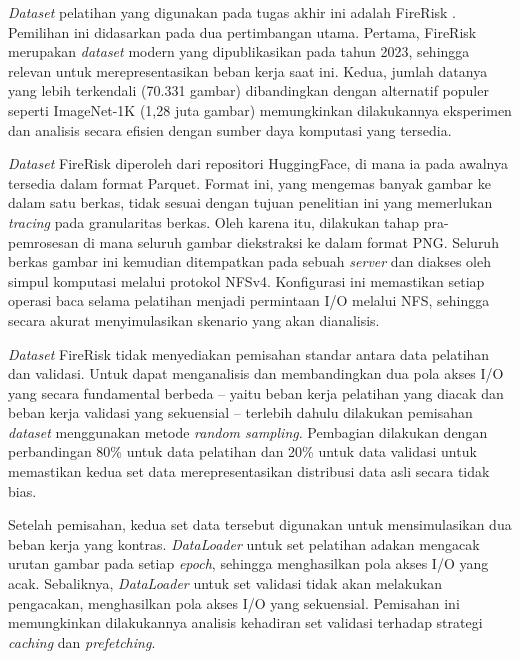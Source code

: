 \textit{Dataset} pelatihan yang digunakan pada tugas akhir ini adalah FireRisk \parencite{FireRisk}. Pemilihan ini didasarkan pada dua pertimbangan utama. Pertama, FireRisk merupakan \textit{dataset} modern yang dipublikasikan pada tahun 2023, sehingga relevan untuk merepresentasikan beban kerja saat ini. Kedua, jumlah datanya yang lebih terkendali (70.331 gambar) dibandingkan dengan alternatif populer seperti ImageNet-1K (1,28 juta gambar) memungkinkan dilakukannya eksperimen dan analisis secara efisien dengan sumber daya komputasi yang tersedia.

\textit{Dataset} FireRisk diperoleh dari repositori HuggingFace, di mana ia pada awalnya tersedia dalam format Parquet. Format ini, yang mengemas banyak gambar ke dalam satu berkas, tidak sesuai dengan tujuan penelitian ini yang memerlukan \textit{tracing} pada granularitas berkas. Oleh karena itu, dilakukan tahap pra-pemrosesan di mana seluruh gambar diekstraksi ke dalam format PNG. Seluruh berkas gambar ini kemudian ditempatkan pada sebuah \textit{server} dan diakses oleh simpul komputasi melalui protokol NFSv4. Konfigurasi ini memastikan setiap operasi baca selama pelatihan menjadi permintaan I/O melalui NFS, sehingga secara akurat menyimulasikan skenario yang akan dianalisis.

\textit{Dataset} FireRisk tidak menyediakan pemisahan standar antara data pelatihan dan validasi. Untuk dapat menganalisis dan membandingkan dua pola akses I/O yang secara fundamental berbeda -- yaitu beban kerja pelatihan yang diacak dan beban kerja validasi yang sekuensial -- terlebih dahulu dilakukan pemisahan \textit{dataset} menggunakan metode \textit{random sampling}. Pembagian dilakukan dengan perbandingan 80\% untuk data pelatihan dan 20\% untuk data validasi untuk memastikan kedua set data merepresentasikan distribusi data asli secara tidak bias.

Setelah pemisahan, kedua set data tersebut digunakan untuk mensimulasikan dua beban kerja yang kontras. \textit{DataLoader} untuk set pelatihan adakan mengacak urutan gambar pada setiap \textit{epoch}, sehingga menghasilkan pola akses I/O yang acak. Sebaliknya, \textit{DataLoader} untuk set validasi tidak akan melakukan pengacakan, menghasilkan pola akses I/O yang sekuensial. Pemisahan ini memungkinkan dilakukannya analisis kehadiran set validasi terhadap strategi \textit{caching} dan \textit{prefetching}.

